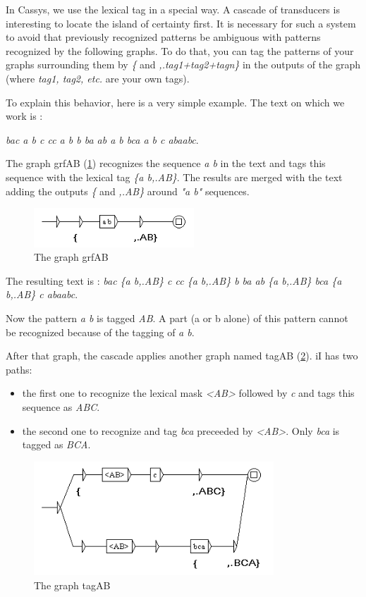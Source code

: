 \bigskip
\noindent In Cassys, we use the lexical tag in a special way. A cascade of transducers is interesting to locate the island of certainty first. It is necessary for such a system to avoid that previously recognized patterns be ambiguous with patterns recognized by the following graphs. To do that, you can tag the patterns of your graphs surrounding them by \emph{\{} and \emph{,.tag1+tag2+tagn\}} in the outputs of the graph (where \emph{tag1, tag2, etc.} are your own tags).

\bigskip
\noindent To explain this behavior, here is a very simple example. The text on which we work is :

\emph{bac a b c cc a b b ba ab a b bca a b c abaabc}.

\bigskip
\noindent The graph grfAB (\ref{fig13-05}) recognizes the sequence \emph{a b} in the text and tags this sequence with the lexical tag \textit{\{a b,.AB\}}. The results are merged with the text adding the outputs \emph{\{ }and \emph{,.AB\}} around \textit{"a b"} sequences. 

\begin{figure}[!htb]
  \centering
  \includegraphics[width=6cm]{resources/img/fig13-05.png}
  \caption{The graph grfAB}
  \label{fig13-05}
\end{figure}

\bigskip
\noindent The resulting text is : \emph{bac \{a b,.AB\} c cc \{a b,.AB\} b ba ab \{a b,.AB\} bca \{a b,.AB\} c abaabc}.

\bigskip
\noindent Now the pattern \emph{a b} is tagged \emph{AB}. A part (a or b alone) of this pattern cannot be recognized because of the tagging of \emph{a b}. 

\bigskip
\noindent After that graph, the cascade applies another graph named tagAB (\ref{fig13-06}). iI has two paths: 
\begin{itemize}
	\item the first one to recognize the lexical mask \textit{<AB>} followed by \textit{c} and tags this sequence as \textit{ABC}.
  \item the second one to recognize and tag \textit{bca} preceeded by \textit{<AB>}. Only \textit{bca} is tagged as \textit{BCA}.
\end{itemize}

\begin{figure}[!htb]
  \centering
  \includegraphics[width=9cm]{resources/img/fig13-06.png}
  \caption{The graph tagAB}
  \label{fig13-06}
\end{figure}

